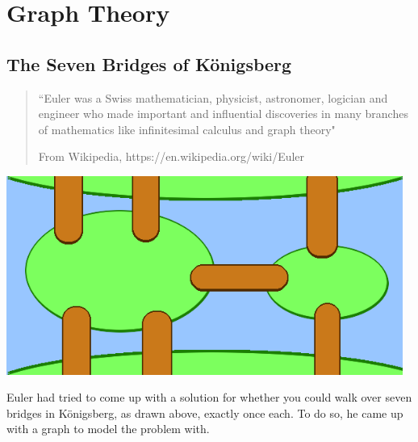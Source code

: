 \documentclass[a4paper,12pt]{book}
\title{}
\author{Rachel Morris}
\date{\today}
\begin{document}
    \togglefalse{answerkey}
    
    \section{Graph Theory}

    \subsection{The Seven Bridges of K{\"o}nigsberg}

    \begin{quote}
    ``Euler was a Swiss mathematician, physicist, astronomer, logician and engineer who made important and influential discoveries in many branches of mathematics like infinitesimal calculus and graph theory"

    \footnotesize From Wikipedia, https://en.wikipedia.org/wiki/Euler
    \end{quote}

    \begin{center}
        \includegraphics[width=13cm]{images/islands.png}
    \end{center}

    Euler had tried to come up with a solution for whether you could walk over seven bridges in K{\"o}nigsberg, as drawn above,
    exactly once each. To do so, he came up with a graph to model the problem with.
\end{document}
